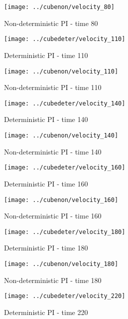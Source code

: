 \begin{figure}[H]
 \centering 
 \texttt{[image: ../cubenon/velocity\_80]}
 \caption{Non-deterministic PI - time 80}
\end{figure}

\begin{figure}[H]
 \centering 
 \texttt{[image: ../cubedeter/velocity\_110]}
 \caption{Deterministic PI - time 110}
\end{figure}

\begin{figure}[H]
 \centering 
 \texttt{[image: ../cubenon/velocity\_110]}
 \caption{Non-deterministic PI - time 110}
\end{figure}

\begin{figure}[H]
 \centering 
 \texttt{[image: ../cubedeter/velocity\_140]}
 \caption{Deterministic PI - time 140}
\end{figure}

\begin{figure}[H]
 \centering 
 \texttt{[image: ../cubenon/velocity\_140]}
 \caption{Non-deterministic PI - time 140}
\end{figure}

\begin{figure}[H]
 \centering 
 \texttt{[image: ../cubedeter/velocity\_160]}
 \caption{Deterministic PI - time 160}
\end{figure}

\begin{figure}[H]
 \centering 
 \texttt{[image: ../cubenon/velocity\_160]}
 \caption{Non-deterministic PI - time 160}
\end{figure}

\begin{figure}[H]
 \centering 
 \texttt{[image: ../cubedeter/velocity\_180]}
 \caption{Deterministic PI - time 180}
\end{figure}

\begin{figure}[H]
 \centering 
 \texttt{[image: ../cubenon/velocity\_180]}
 \caption{Non-deterministic PI - time 180}
\end{figure}

\begin{figure}[H]
 \centering 
 \texttt{[image: ../cubedeter/velocity\_220]}
 \caption{Deterministic PI - time 220}
\end{figure}

